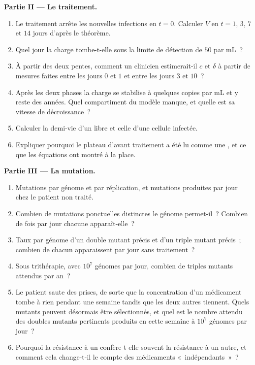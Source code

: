 \begin{problem}
\medskip
\noindent\textbf{Partie II --- Le traitement.}
\begin{enumerate}[resume]
  \item Le traitement arrête les nouvelles infections en $t = 0$.
        Calculer $V$ en $t =
        1$, $3$, $7$ et $14$ jours d'après le théorème.
  \item Quel jour la charge tombe-t-elle sous la limite de détection de
        $50$ par mL~?
  \item À partir des deux pentes, comment un clinicien estimerait-il
        $c$ et $\delta$ à partir de mesures faites entre les jours
        $0$ et $1$ et entre les jours $3$ et $10$~?
  \item Après les deux phases la charge se stabilise à quelques copies
        par mL et y reste des années. Quel compartiment du modèle
        manque, et quelle est sa vitesse de décroissance~?
  \item Calculer la demi-vie d'un  libre et celle d'une cellule
        infectée.
  \item Expliquer pourquoi le plateau d'avant traitement a été lu comme
        une , et ce que les équations ont montré à la place.
\end{enumerate}

\medskip
\noindent\textbf{Partie III --- La mutation.}
\begin{enumerate}[resume]
  \item Mutations par génome et par réplication, et mutations produites
        par jour chez le patient non traité.
  \item Combien de mutations ponctuelles distinctes le génome
        permet-il~? Combien de fois par jour chacune apparaît-elle~?
  \item Taux par génome d'un double mutant précis et d'un triple mutant
        précis~; combien de chacun apparaissent par jour sans
        traitement~?
  \item Sous trithérapie, avec $10^{7}$ génomes par jour, combien de
        triples mutants attendus par an~?
  \item Le patient saute des prises, de sorte que la concentration d'un
        médicament tombe à rien pendant une semaine tandis que les deux
        autres tiennent. Quels mutants peuvent désormais être
        sélectionnés, et quel est le nombre attendu des doubles mutants
        pertinents produits en cette semaine à $10^{7}$ génomes par
        jour~?
  \item Pourquoi la résistance à un 
        confère-t-elle souvent la résistance à un autre, et comment
        cela change-t-il le compte des médicaments «~indépendants~»~?
\end{enumerate}


\end{problem}

